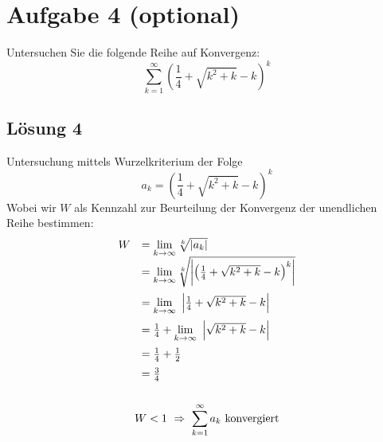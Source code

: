 \section{Aufgabe 4 (optional)}

Untersuchen Sie die folgende Reihe auf Konvergenz:
\begin{equation*}
  \sum _{k=1}^{\infty }\left(\frac{1}{4} +\sqrt{k^{2} +k} -k\right)^{k}
\end{equation*}

\subsection{Lösung 4}

Untersuchung mittels Wurzelkriterium der Folge
\begin{equation*}
  a_{k} =\left(\frac{1}{4} +\sqrt{k^{2} +k} -k\right)^{k}
\end{equation*}
Wobei wir $\displaystyle W$ als Kennzahl zur Beurteilung der Konvergenz der unendlichen Reihe bestimmen:
\begin{gather*}
  \begin{array}{ r l }
    W & =\lim\limits _{k\rightarrow \infty }\sqrt[k]{| a_{k}| }\\
    & =\lim\limits _{k\rightarrow \infty }\sqrt[k]{\left| \left(\frac{1}{4} +\sqrt{k^{2} +k} -k\right)^{k}\right| }\vspace{2mm}\\
    & =\lim\limits _{k\rightarrow \infty } \ \left| \frac{1}{4} +\sqrt{k^{2} +k} -k\right| \vspace{2mm}\\
    & =\frac{1}{4} +\lim\limits _{k\rightarrow \infty } \ \left| \sqrt{k^{2} +k} -k\right| \vspace{2mm}\\
    & =\frac{1}{4} +\frac{1}{2}\vspace{2mm}\\
    & =\frac{3}{4}
  \end{array}\\
  \\
  W< 1\ \Rightarrow \ \sum _{k=1}^{\infty } a_{k} \ \text{konvergiert}
\end{gather*}
